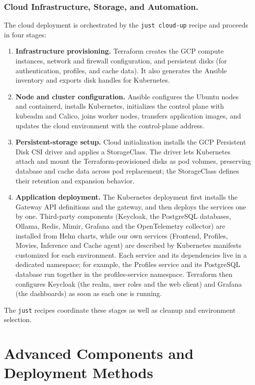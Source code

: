 \documentclass[10pt]{llncs}
\begin{document}
\subsubsection{Cloud Infrastructure, Storage, and Automation.}

The cloud deployment is orchestrated by the \texttt{just cloud-up} recipe and proceeds in four stages:

\begin{enumerate}
    \item \textbf{Infrastructure provisioning.} Terraform creates the GCP compute instances, network and firewall configuration, and persistent disks (for authentication, profiles, and cache data). It also generates the Ansible inventory and exports disk handles for Kubernetes.
    \item \textbf{Node and cluster configuration.} Ansible configures the Ubuntu nodes and containerd, installs Kubernetes, initializes the control plane with kubeadm and Calico, joins worker nodes, transfers application images, and updates the cloud environment with the control-plane address.
    \item \textbf{Persistent-storage setup.} Cloud initialization installs the GCP Persistent Disk CSI driver and applies a StorageClass. The driver lets Kubernetes attach and mount the Terraform-provisioned disks as pod volumes, preserving database and cache data across pod replacement; the StorageClass defines their retention and expansion behavior.
    \item \textbf{Application deployment.} The Kubernetes deployment first installs the Gateway API definitions and the gateway, and then deploys the services one by one. Third-party components (Keycloak, the PostgreSQL databases, Ollama, Redis, Mimir, Grafana and the OpenTelemetry collector) are installed from Helm charts, while our own services (Frontend, Profiles, Movies, Inference and Cache agent) are described by Kubernetes manifests customized for each environment. Each service and its dependencies live in a dedicated namespace; for example, the Profiles service and its PostgreSQL database run together in the profiles-service namespace. Terraform then configures Keycloak (the realm, user roles and the web client) and Grafana (the dashboards) as soon as each one is running.
\end{enumerate}

The \texttt{just} recipes coordinate these stages as well as cleanup and environment selection.


\section{Advanced Components and Deployment Methods}
\end{document}
